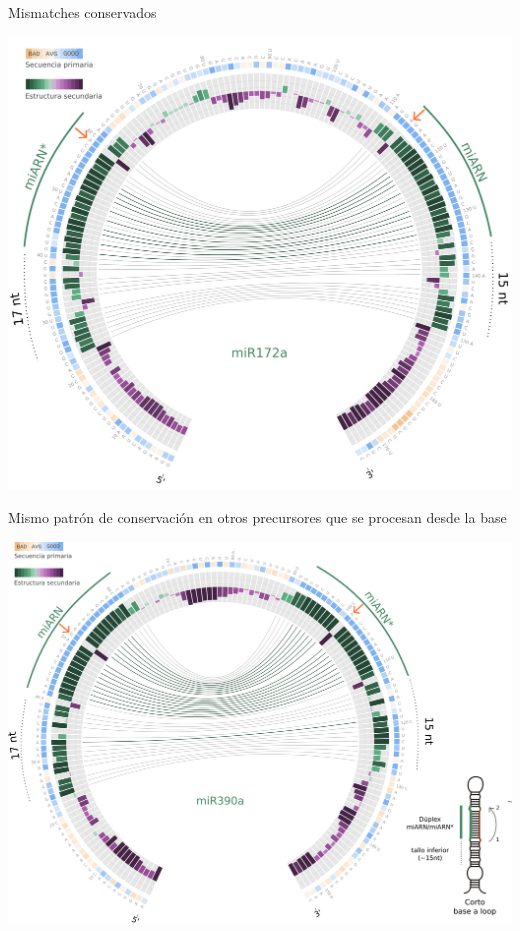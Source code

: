 \documentclass{beamer}
\begin{document}
\begin{frame}{Mismatches conservados}
	\begin{center}
		\includegraphics[width=.8\textwidth]{img/miR172a_circos06.png}
	\end{center}
\end{frame}

\begin{frame}{Mismo patrón de conservación en otros precursores que se procesan desde la base}
	\begin{center}
		\includegraphics[width=.8\textwidth]{img/miR390a_circos_defensa.png}
	\end{center}
\end{frame}
\end{document}
